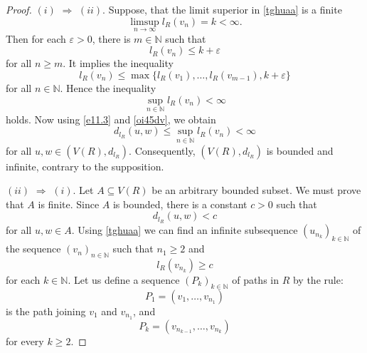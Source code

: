\documentclass[10pt,a4paper]{amsart}
\begin{document}
\begin{proof}

$ (i)$ $\Rightarrow$ $(ii)$. %
Suppose, that the limit superior in \eqref{tghuaa} is a finite %
\begin{equation}
\limsup_{n \to \infty} l_R(v_n) = k < \infty.
\end{equation}
Then for each $\varepsilon > 0$, there is $m \in \mathbb{N}$ such that  
\begin{equation*}
l_R(v_n) \leq k + \varepsilon 
\end{equation*}
for all $n \geq m.$ It implies the inequality  
\begin{equation*}
l_R(v_n) \leq \max\{l_R(v_1), \ldots, l_R(v_{m-1}), k + \varepsilon\}
\end{equation*}
for all $n \in \mathbb{N}$. Hence the inequality
\begin{equation}\label{oi45dv}
\sup_{n \in \mathbb{N}} l_R(v_n) < \infty
\end{equation}
holds. Now using \eqref{e11.3} and \eqref{oi45dv}, we obtain
\begin{equation*}
d_{l_R}(u, w) \leq \sup_{n \in \mathbb{N}} l_R(v_n) < \infty
\end{equation*}
for all $u, w \in (V(R),d_{l_R})$. Consequently, $(V(R),d_{l_R})$ is bounded and infinite, contrary to the supposition.

$(ii)$ $\Rightarrow$ $(i)$. %
Let $A \subseteq V(R)$ be an arbitrary bounded subset.
We must prove that $A$ is finite.
Since $A$ is bounded, there is a constant $c > 0$ such that
\begin{equation}\label{jtfdqw11}
d_{l_R}(u, w) < c 
\end{equation}
for all $u, w \in A$. Using \eqref{tghuaa} we can find an infinite subsequence $(u_{n_k})_{k \in \mathbb{N}}$ of the sequence $(v_n)_{n \in \mathbb{N}}$ such that $n_1 \geq 2$ and
\begin{equation}\label{onhwer12}
l_R(v_{n_k}) \geq c
\end{equation}
for each $k \in \mathbb{N}$. Let us define a sequence $(P_k)_{k \in \mathbb{N}}$ of paths in $R$ by the rule: 
\begin{equation*}
P_1= (v_1, \ldots, v_{n_1})
\end{equation*}
is
the path joining $v_1$ and $v_{n_1}$, and 
\begin{equation*}
P_k = (v_{n_{k-1}}, \ldots, v_{n_k})
\end{equation*}
for every $k \geq 2$.


\end{proof}
\end{document}
